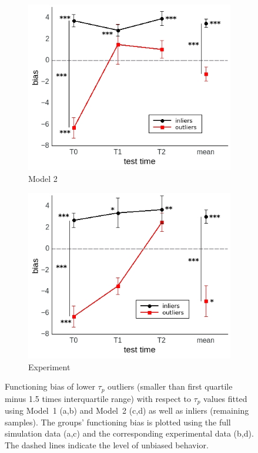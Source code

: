 \documentclass[a4paper]{scrreprt}
\begin{document}
\begin{figure}
\begin{subfigure}[b]{0.49\textwidth}
        \includegraphics[width=\textwidth]{figs/sec3/outliers/outliers_mod2mod2.jpeg}
        \caption{Model 2}
    \end{subfigure}
    \begin{subfigure}[b]{0.49\textwidth}
        \includegraphics[width=\textwidth]{figs/sec3/outliers/outliers_mod2dat.jpeg}
        \caption{Experiment}
    \end{subfigure}
\caption{Functioning bias of lower $\tau_p$ outliers (smaller than first quartile minus 1.5 times interquartile range) with respect to $\tau_p$ values fitted using Model~1 (a,b) and Model~2 (c,d) as well as inliers (remaining samples). The groups' functioning bias is plotted using the full simulation data (a,c) and the corresponding experimental data (b,d). The dashed lines indicate the level of unbiased behavior.}
\label{fig:outliers_pred}
\end{figure}
\end{document}
